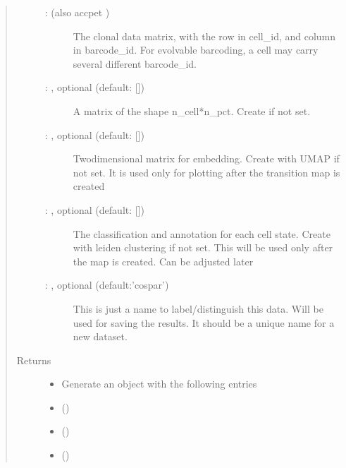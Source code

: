 \documentclass[letterpaper,10pt,english]{sphinxmanual}
\begin{document}
\begin{fulllineitems}
\begin{quote}
\begin{description}
\begin{description}
\item[{ :  (also accpet )}] \leavevmode
The clonal data matrix, with the row in cell\_id, and column in barcode\_id.
For evolvable barcoding, a cell may carry several different barcode\_id.

\item[{ : , optional (default: {[}{]})}] \leavevmode
A matrix of the shape n\_cell*n\_pct. Create if not set.

\item[{ : , optional (default: {[}{]})}] \leavevmode
Two\sphinxhyphen{}dimensional matrix for embedding.  Create with UMAP if not set.
It is used only for plotting after the transition map is created

\item[{ : , optional (default: {[}{]})}] \leavevmode
The classification and annotation for each cell state.
Create with leiden clustering if not set.
This will be used only after the map is created. Can be adjusted later

\item[{ : , optional (default:’cospar’)}] \leavevmode
This is just a name to label/distinguish this data.
Will be used for saving the results.
It should be a unique name for a new dataset.

\end{description}

\item[{Returns}] \leavevmode
\begin{itemize}
\item {} 
Generate an  object with the following entries

\item {} 
 ()

\item {} 
 ()

\item {} 
 ()

\end{itemize}


\end{description}\end{quote}

\end{fulllineitems}
\end{document}
